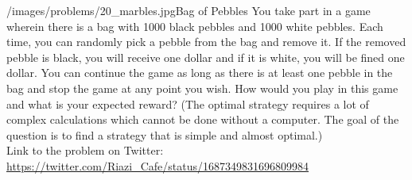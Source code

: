 \begin{problem}{/images/problems/20_marbles.jpg}{Bag of Pebbles}
	You take part in a game wherein there is a bag with 1000 black pebbles and 1000 white pebbles. Each time, you can randomly pick a pebble from the bag and remove it. If the removed pebble is black, you will receive one dollar and if it is white, you will be fined one dollar. You can continue the game as long as there is at least one pebble in the bag and stop the game at any point you wish. How would you play in this game and what is your expected reward? (The optimal strategy requires a lot of complex calculations which cannot be done without a computer. The goal of the question is to find a strategy that is simple and almost optimal.)\\[0.2cm]

Link to the problem on Twitter:  \url{https://twitter.com/Riazi_Cafe/status/1687349831696809984}
\end{problem}
